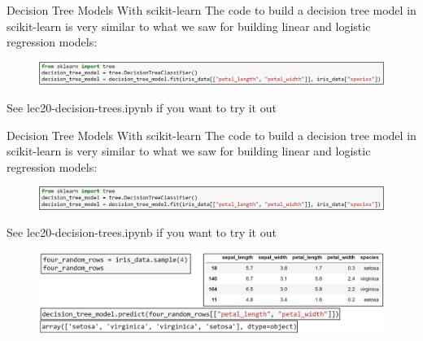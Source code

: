 \documentclass[aspectratio=169]{../latex_main/tntbeamer}  %
\begin{document}
	
		\begin{frame}{Decision Tree Models With scikit-learn }
	    The code to build a decision tree model in scikit-learn is very similar to what we saw for building linear and logistic regression models:
	    \begin{figure}
	        \centering
	        \includegraphics[scale=.6]{Bild17}
	    \end{figure}
	    See lec20-decision-trees.ipynb if you want to try it out
	\end{frame}
	
	
	
	\begin{frame}{Decision Tree Models With scikit-learn }
	    The code to build a decision tree model in scikit-learn is very similar to what we saw for building linear and logistic regression models:
	    \begin{figure}
	        \centering
	        \includegraphics[scale=.6]{Bild17}
	    \end{figure}
	    See lec20-decision-trees.ipynb if you want to try it out
        \begin{figure}
            \centering
            \includegraphics[scale=.4]{Bild18}
        \end{figure}
	\end{frame}
	
\end{document}
